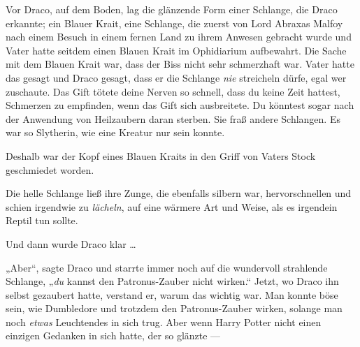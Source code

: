 Vor Draco, auf dem Boden, lag die glänzende Form einer Schlange, die Draco erkannte; ein Blauer Krait, eine Schlange, die zuerst von Lord Abraxas Malfoy nach einem Besuch in einem fernen Land zu ihrem Anwesen gebracht wurde und Vater hatte seitdem einen Blauen Krait im Ophidiarium aufbewahrt. Die Sache mit dem Blauen Krait war, dass der Biss nicht sehr schmerzhaft war. Vater hatte das gesagt und Draco gesagt, dass er die Schlange \emph{nie} streicheln dürfe, egal wer zuschaute. Das Gift tötete deine Nerven so schnell, dass du keine Zeit hattest, Schmerzen zu empfinden, wenn das Gift sich ausbreitete. Du könntest sogar nach der Anwendung von Heilzaubern daran sterben. Sie fraß andere Schlangen. Es war so Slytherin, wie eine Kreatur nur sein konnte.

Deshalb war der Kopf eines Blauen Kraits in den Griff von Vaters Stock geschmiedet worden.

Die helle Schlange ließ ihre Zunge, die ebenfalls silbern war, hervorschnellen und schien irgendwie zu \emph{lächeln}, auf eine wärmere Art und Weise, als es irgendein Reptil tun sollte.

Und dann wurde Draco klar …

„Aber“, sagte Draco und starrte immer noch auf die wundervoll strahlende Schlange,
„\emph{du} kannst den Patronus-Zauber nicht wirken.“ Jetzt, wo Draco ihn selbst gezaubert hatte, verstand er, warum das wichtig war. Man konnte böse sein, wie Dumbledore und trotzdem den Patronus-Zauber wirken, solange man noch \emph{etwas} Leuchtendes in sich trug.
Aber wenn Harry Potter nicht einen einzigen Gedanken in sich hatte, der so glänzte —

